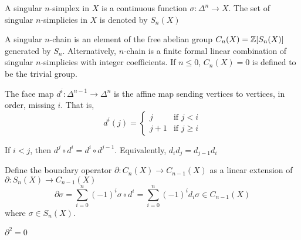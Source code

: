 \documentclass{report}
\begin{document}
\begin{definition}
    A singular $n$-simplex in $X$ is a continuous function $\sigma: \Delta^n \to X$. The set of singular $n$-simplicies in $X$ is denoted by $S_n(X)$
\end{definition}

\begin{definition}
    A singular $n$-chain is an element of the free abelian group $C_n(X) = \mathbb{Z}[S_n(X)]$ generated by $S_n$. Alternatively, $n$-chain is a finite formal linear combination of singular $n$-simplicies with integer coefficients. If $n \leq 0$, $C_n(X) = 0$ is defined to be the trivial group.
\end{definition}

\begin{definition}
    The face map $d^i: \Delta^{n-1} \to \Delta^n$ is the affine map sending vertices to vertices, in order, missing $i$. That is, 
    $$
        d^i(j) = \begin{cases}
            j &\text{if $j < i$} \\
            j+1 &\text{if $j \geq i$}
        \end{cases}
    $$
\end{definition}

\begin{proposition}
    If $i < j$, then $d^j \circ d^i = d^i \circ d^{j-1}$. Equivalently, $d_i d_j = d_{j-1} d_i$
\end{proposition}

\begin{definition}
    Define the boundary operator $\partial: C_n(X) \to C_{n-1}(X)$ as a linear extension of $\partial: S_n(X) \to C_{n-1}(X)$ 
    $$
        \partial \sigma = \sum_{i=0}^n (-1)^i \sigma \circ d^i = \sum_{i=0}^n (-1)^i d_i \sigma \in C_{n-1}(X)
    $$
    where $\sigma \in S_n(X)$. 
\end{definition}

\begin{proposition}
    $\partial^2 = 0$
\begin{center}
\end{center}

\end{proposition}
\end{document}
